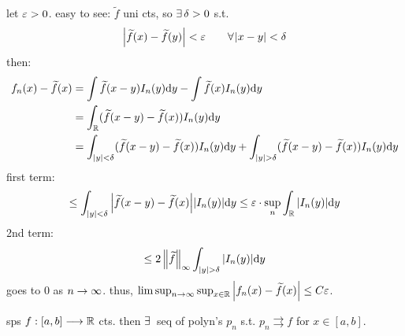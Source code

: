 \begin{pf}[source=Primary Source Material]
	let $\varepsilon>0$. easy to see: $\tilde{f}$ uni cts, so $\ex\delta>0$ s.t.
	\begin{equation*}
		\abs{\tilde{f}(x)-\tilde{f}(y)}<\ep \qquad \fa\abs{x-y}<\delta
	\end{equation*}
	then:
	\begin{align*}
		f_{n}(x)-\widetilde{f}(x)
		& = \int\widetilde{f}(x-y)I_{n}(y)\textrm{d} y - \int\widetilde{f}(x)I_{n}(y)\textrm{d} y \\
		& = \int_{\mathbb{R}}(\widetilde{f}(x-y)-\widetilde{f}(x))I_{n}(y)\textrm{d} y \\
		& = \int_{\abs{y}<\delta}(\widetilde{f}(x-y)-\widetilde{f}(x))I_{n}(y)\textrm{d} y
		+ \int_{\abs{y}>\delta}(\widetilde{f}(x-y)-\widetilde{f}(x))I_{n}(y)\textrm{d} y
	\end{align*}
	first term:
	\begin{equation*}
		\leq \int_{\abs{y}<\delta}\abs{\widetilde{f}(x-y)-\widetilde{f}(x)}\abs{I_{n}(y)}\textrm{d} y
		\leq \varepsilon\cdot\sup_{n}\int_{\mathbb{R}}\abs{I_{n}(y)}\textrm{d} y
	\end{equation*}
	2nd term:
	\begin{equation*}
		\leq 2\left\|\widetilde{f}\right\|_{\infty}\int_{\abs{y}>\delta}\abs{I_{n}(y)}\textrm{d} y
	\end{equation*}
	goes to 0 as $n\rightarrow\infty$.
	thus, $\limsup_{n\rightarrow\infty}\sup_{x\in\mathbb{R}}\abs{f_{n}(x)-\widetilde{f}(x)}\leq C\varepsilon$.
\end{pf}

\newpage
\begin{thm}[title=Weierstrass Approximation Theorem]
	sps $f:[a,b]\longrightarrow\mathbb{R}$ cts.
	then $\ex$ seq of polyn's $p_{n}$ s.t. $p_{n}\rightrightarrows f$ for $x\in[a,b]$.
\end{thm} \

